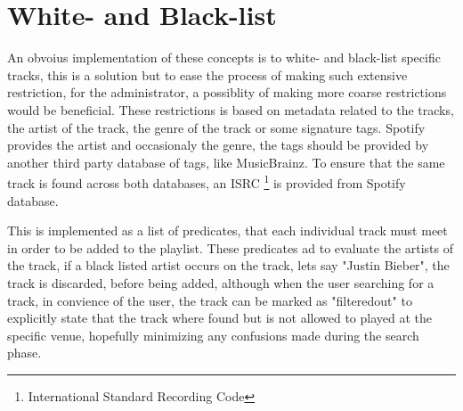 \section{White- and Black-list}

An obvoius implementation of these concepts is to white- and black-list specific tracks, this is a solution but to ease the process of making such extensive restriction, for the administrator, a possiblity of making more coarse restrictions would be beneficial. These restrictions is based on metadata related to the tracks, the artist of the track, the genre of the track or some signature tags. Spotify provides the artist and occasionaly the genre, the tags should be provided by another third party database of tags, like MusicBrainz. To ensure that the same track is found across both databases, an ISRC \footnote{International Standard Recording Code\cite{isrc}} is provided from Spotify database.

This is implemented as a list of predicates, that each individual track must meet in order to be added to the playlist. These predicates ad to evaluate the artists of the track, if a black listed artist occurs on the track, lets say "Justin Bieber", the track is discarded, before being added, although when the user searching for a track, in convience of the user, the track can be marked as "filteredout" to explicitly state that the track where found but is not allowed to played at the specific venue, hopefully minimizing any confusions made during the search phase.

